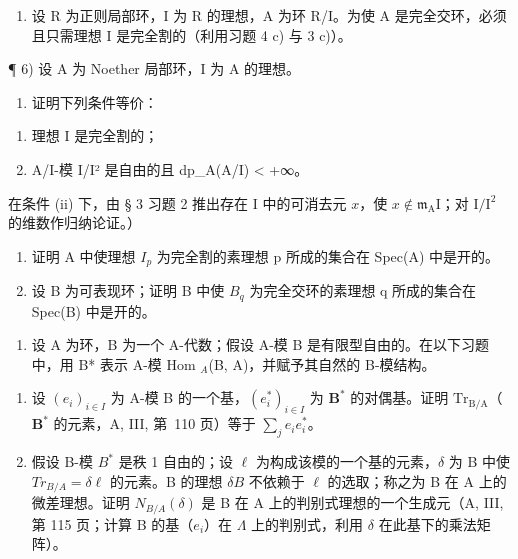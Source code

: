 \begin{enumerate}
\def\labelenumi{\arabic{enumi})}
\setcounter{enumi}{4}
\tightlist
\item
  设 R 为正则局部环，I 为 R 的理想，A 为环 R/I。为使 A 是完全交环，必须且只需理想 I 是完全割的（利用习题 4 c) 与 3 c)）。
\end{enumerate}

¶ 6) 设 A 为 Noether 局部环，I 为 A 的理想。

\begin{enumerate}
\def\labelenumi{\alph{enumi})}
\tightlist
\item
  证明下列条件等价：
\end{enumerate}

\begin{enumerate}
\def\labelenumi{(\roman{enumi})}
\item
  理想 I 是完全割的；
\item
  A/I-模 I/I² 是自由的且 dp\_A(A/I) \textless{} +∞。
\end{enumerate}

在条件 (ii) 下，由 § 3 习题 2 推出存在 I 中的可消去元 \(x\)，使 \(x \notin \mathfrak{m}_{\mathrm{A}}\mathrm{I}\)；对 \(\mathrm{I} / \mathrm{I}^2\) 的维数作归纳论证。）

\begin{enumerate}
\def\labelenumi{\alph{enumi})}
\setcounter{enumi}{1}
\item
  证明 A 中使理想 \(I_{p}\) 为完全割的素理想 p 所成的集合在 Spec(A) 中是开的。
\item
  设 B 为可表现环；证明 B 中使 \(B_{q}\) 为完全交环的素理想 q 所成的集合在 Spec(B) 中是开的。
\end{enumerate}

\begin{enumerate}
\def\labelenumi{\arabic{enumi})}
\setcounter{enumi}{6}
\tightlist
\item
  设 A 为环，B 为一个 A-代数；假设 A-模 B 是有限型自由的。在以下习题中，用 B* 表示 A-模 Hom \(_{A}\)(B, A)，并赋予其自然的 B-模结构。
\end{enumerate}

\begin{enumerate}
\def\labelenumi{\alph{enumi})}
\item
  设 \((e_i)_{i\in I}\) 为 A-模 B 的一个基，\((e_i^*)_{i\in I}\) 为 \(\mathbf{B}^*\) 的对偶基。证明 \(\mathrm{Tr}_{\mathrm{B / A}}\)（\(\mathbf{B}^*\) 的元素，A, III, 第~110 页）等于 \(\sum_{j}e_{i}e_{i}^{*}\)。
\item
  假设 B-模 \(B^{*}\) 是秩 1 自由的；设 \(\ell\) 为构成该模的一个基的元素，\(\delta\) 为 B 中使 \(Tr_{B/A} = \delta\ell\) 的元素。B 的理想 \(\delta B\) 不依赖于 \(\ell\) 的选取；称之为 B 在 A 上的微差理想。证明 \(N_{B/A}(\delta)\) 是 B 在 A 上的判别式理想的一个生成元（A, III, 第 115 页；计算 B 的基（\(e_{i}\)）在 \(\Lambda\) 上的判别式，利用 \(\delta\) 在此基下的乘法矩阵）。
\end{enumerate}

